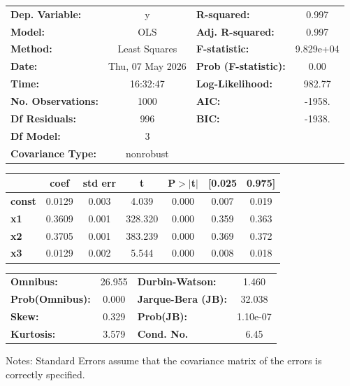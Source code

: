 \begin{center}
\begin{tabular}{lclc}
\toprule
\textbf{Dep. Variable:}    &        y         & \textbf{  R-squared:         } &     0.997   \\
\textbf{Model:}            &       OLS        & \textbf{  Adj. R-squared:    } &     0.997   \\
\textbf{Method:}           &  Least Squares   & \textbf{  F-statistic:       } & 9.829e+04   \\
\textbf{Date:}             & Thu, 07 May 2026 & \textbf{  Prob (F-statistic):} &     0.00    \\
\textbf{Time:}             &     16:32:47     & \textbf{  Log-Likelihood:    } &    982.77   \\
\textbf{No. Observations:} &        1000      & \textbf{  AIC:               } &    -1958.   \\
\textbf{Df Residuals:}     &         996      & \textbf{  BIC:               } &    -1938.   \\
\textbf{Df Model:}         &           3      & \textbf{                     } &             \\
\textbf{Covariance Type:}  &    nonrobust     & \textbf{                     } &             \\
\bottomrule
\end{tabular}
\begin{tabular}{lcccccc}
               & \textbf{coef} & \textbf{std err} & \textbf{t} & \textbf{P$> |$t$|$} & \textbf{[0.025} & \textbf{0.975]}  \\
\midrule
\textbf{const} &       0.0129  &        0.003     &     4.039  &         0.000        &        0.007    &        0.019     \\
\textbf{x1}    &       0.3609  &        0.001     &   328.320  &         0.000        &        0.359    &        0.363     \\
\textbf{x2}    &       0.3705  &        0.001     &   383.239  &         0.000        &        0.369    &        0.372     \\
\textbf{x3}    &       0.0129  &        0.002     &     5.544  &         0.000        &        0.008    &        0.018     \\
\bottomrule
\end{tabular}
\begin{tabular}{lclc}
\textbf{Omnibus:}       & 26.955 & \textbf{  Durbin-Watson:     } &    1.460  \\
\textbf{Prob(Omnibus):} &  0.000 & \textbf{  Jarque-Bera (JB):  } &   32.038  \\
\textbf{Skew:}          &  0.329 & \textbf{  Prob(JB):          } & 1.10e-07  \\
\textbf{Kurtosis:}      &  3.579 & \textbf{  Cond. No.          } &     6.45  \\
\bottomrule
\end{tabular}
\end{center}

Notes: \newline
 [1] Standard Errors assume that the covariance matrix of the errors is correctly specified.